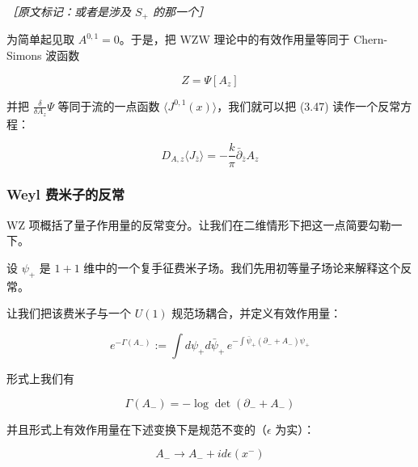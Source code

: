 {\small\itshape ［原文标记：或者是涉及 $S_+$ 的那一个］}

为简单起见取 $A^{0,1}=0$。于是，把 WZW 理论中的有效作用量等同于 Chern-Simons 波函数

\begin{equation}
  Z=\Psi[A_z]
  \tag{4.98}
  \label{eq:4.98}
\end{equation}

并把 $\frac{\delta}{\delta A_z}\Psi$ 等同于流的一点函数 $\langle J^{0,1}(x)\rangle$，我们就可以把 (3.47) 读作一个反常方程：

\begin{equation}
  D_{A,z}\langle J_{\bar z}\rangle=-\frac{k}{\pi}\bar\partial_{\bar z}A_z
  \tag{4.99}
  \label{eq:4.99}
\end{equation}


\subsubsection{Weyl 费米子的反常} %

WZ 项概括了量子作用量的反常变分。让我们在二维情形下把这一点简要勾勒一下。

设 $\psi_+$ 是 $1+1$ 维中的一个复手征费米子场。我们先用初等量子场论来解释这个反常。

让我们把该费米子与一个 $U(1)$ 规范场耦合，并定义有效作用量：

\begin{equation}
  e^{-\Gamma(A_-)}:=\int d\psi_+d\bar\psi_+\,e^{-\int\bar\psi_+(\partial_-+A_-)\psi_+}
  \tag{4.100}
  \label{eq:4.100}
\end{equation}

形式上我们有

\begin{equation}
  \Gamma(A_-)=-\log\det(\partial_-+A_-)
  \tag{4.101}
  \label{eq:4.101}
\end{equation}

并且形式上有效作用量在下述变换下是规范不变的（$\epsilon$ 为实）：

\begin{equation}
  A_-\to A_-+id\epsilon(x^-)
  \tag{4.102}
  \label{eq:4.102}
\end{equation}

